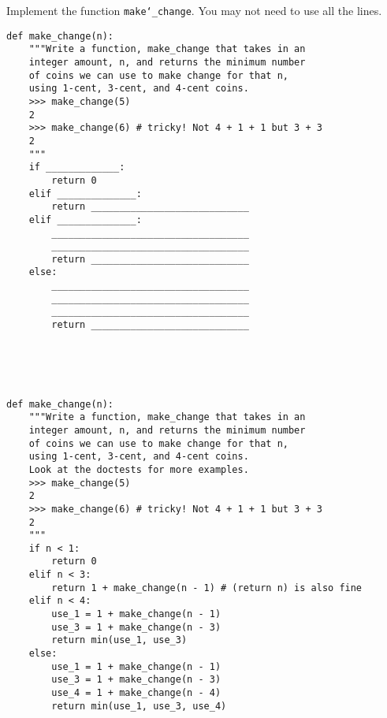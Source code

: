 \begin{blocksection}
\question Implement the function \texttt{make\char`_change}. You may not need to use all the lines.\\

\begin{lstlisting}
def make_change(n):
    """Write a function, make_change that takes in an
    integer amount, n, and returns the minimum number
    of coins we can use to make change for that n, 
    using 1-cent, 3-cent, and 4-cent coins. 
    >>> make_change(5)
    2
    >>> make_change(6) # tricky! Not 4 + 1 + 1 but 3 + 3
    2
    """
    if _____________:
        return 0
    elif ______________:
        return ____________________________
    elif ______________:
        ___________________________________
        ___________________________________
        return ____________________________
    else:
        ___________________________________
        ___________________________________
        ___________________________________
        return ____________________________


\end{lstlisting}

\end{blocksection}
\\ \\
\begin{blocksection}

\begin{solution}
\begin{lstlisting}
def make_change(n):
    """Write a function, make_change that takes in an
    integer amount, n, and returns the minimum number
    of coins we can use to make change for that n, 
    using 1-cent, 3-cent, and 4-cent coins. 
    Look at the doctests for more examples.
    >>> make_change(5)
    2
    >>> make_change(6) # tricky! Not 4 + 1 + 1 but 3 + 3
    2
    """
    if n < 1:
        return 0
    elif n < 3:
        return 1 + make_change(n - 1) # (return n) is also fine
    elif n < 4:
        use_1 = 1 + make_change(n - 1)
        use_3 = 1 + make_change(n - 3)
        return min(use_1, use_3)
    else:
        use_1 = 1 + make_change(n - 1)
        use_3 = 1 + make_change(n - 3)
        use_4 = 1 + make_change(n - 4)
        return min(use_1, use_3, use_4)
\end{lstlisting}
\end{solution}
\end{blocksection}
